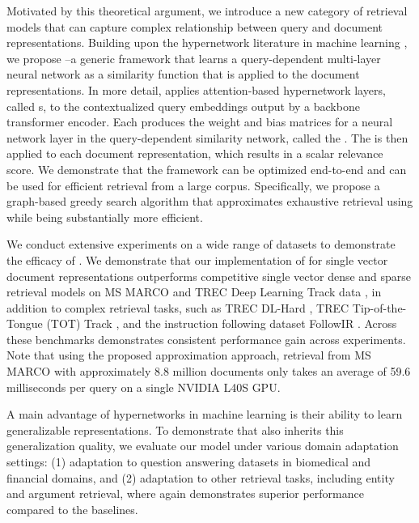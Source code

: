 \documentclass[sigconf,]{acmart}
\begin{document}
Motivated by this theoretical argument, we introduce a new category of retrieval models that can capture complex relationship between query and document representations. Building upon the hypernetwork literature in machine learning \cite{HyperNetworks, HyperShot, ContinualLearningWithHypernetworks}, we propose \name{}--a generic framework that learns a query-dependent multi-layer neural network as a similarity function that is applied to the document representations. In more detail, \name{} applies attention-based hypernetwork layers, called \hyperheadlayer{}s, to the contextualized query embeddings output by a backbone transformer encoder. Each \hyperheadlayer{} produces the weight and bias matrices for a neural network layer in the query-dependent similarity network, called the \mininame{}. The \mininame{} is then applied to each document representation, which results in a scalar relevance score. We demonstrate that the \name{} framework can be optimized end-to-end and can be used for efficient retrieval from a large corpus. Specifically, we propose a graph-based greedy search algorithm that approximates exhaustive retrieval using \name{} while being substantially more efficient.

We conduct extensive experiments on a wide range of datasets to demonstrate the efficacy of \name{}. We demonstrate that our implementation of \name{} for single vector document representations outperforms competitive single vector dense and sparse retrieval models on MS MARCO \cite{MSMARCO} and TREC Deep Learning Track data \cite{TREC_DL_2019, TREC_DL_2020}, in addition to complex retrieval tasks, such as TREC DL-Hard \cite{TREC_DL_HARD}, TREC Tip-of-the-Tongue (TOT) Track \cite{TREC-TOT-2023}, and the instruction following dataset FollowIR \cite{FollowIR}. Across these benchmarks \name{} demonstrates consistent performance gain across experiments. Note that using the proposed approximation approach, retrieval from MS MARCO \cite{MSMARCO} with approximately 8.8 million documents only takes an average of 59.6 milliseconds per query on a single NVIDIA L40S GPU.

A main advantage of hypernetworks in machine learning is their ability to learn generalizable representations. To demonstrate that \name{} also inherits this generalization quality, we evaluate our model under various domain adaptation settings: (1) adaptation to question answering datasets in biomedical and financial domains, and (2) adaptation to other retrieval tasks, including entity and argument retrieval, where \name{} again demonstrates superior performance compared to the baselines.
\end{document}
